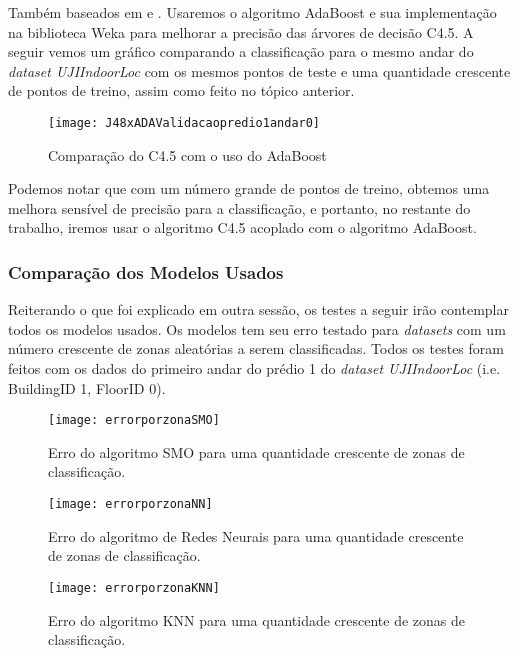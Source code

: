 Também baseados em \cite{comparative} e \cite{comparativeEN}. Usaremos o algoritmo AdaBoost  e sua implementação na biblioteca Weka para melhorar a precisão das árvores de decisão C4.5. A seguir vemos um gráfico comparando a classificação para o mesmo andar do \textit{dataset UJIIndoorLoc} com os mesmos pontos de teste e uma quantidade crescente de pontos de treino, assim como feito no tópico anterior.


\begin{figure}[!h]
\centering
\caption{Comparação do C4.5 com o uso do AdaBoost}
 \texttt{[image: J48xADAValidacaopredio1andar0]}
\label{fig:comparisonC4.5andAdaBoost}  
\end{figure}


Podemos notar que com um número grande de pontos de treino, obtemos uma melhora sensível de precisão para a classificação, e portanto, no restante do trabalho, iremos usar o algoritmo C4.5 acoplado com o algoritmo AdaBoost.



\subsubsection{Comparação dos Modelos Usados}


Reiterando o que foi explicado em outra sessão, os testes a seguir irão contemplar todos os modelos usados. Os modelos tem seu erro testado para \textit{datasets} com um número crescente de zonas aleatórias a serem classificadas. Todos os testes foram feitos com os dados do primeiro andar do prédio 1 do \textit{dataset UJIIndoorLoc }(i.e. BuildingID 1, FloorID 0).


\begin{figure}
	\centering
	\caption{Erro do algoritmo SMO  para uma quantidade crescente de zonas de classificação.}
  \texttt{[image: errorporzonaSMO]}
\label{fig:zonaSMO}

\end{figure}



\begin{figure}
	\centering
	\caption{Erro do algoritmo de Redes Neurais  para uma quantidade crescente de zonas de classificação.}
  \texttt{[image: errorporzonaNN]}
\label{fig:zonaNN}

\end{figure}


\begin{figure}
	\centering
	\caption{Erro do algoritmo KNN para uma quantidade crescente de zonas de classificação.}
  \texttt{[image: errorporzonaKNN]}
\label{fig:zonaKNN}

\end{figure}



